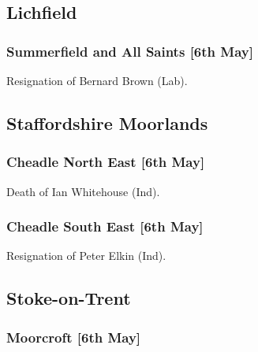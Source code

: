 \documentclass[a4paper,openany]{book}
\begin{document}
\begin{resultsiii}
\subsection*{Lichfield}

\subsubsection*{Summerfield and All Saints \hspace*{\fill}\nolinebreak[1]%
	\enspace\hspace*{\fill}
	[6th May]}


Resignation of Bernard Brown (Lab).

\subsection*{Staffordshire Moorlands}

\subsubsection*{Cheadle North East \hspace*{\fill}\nolinebreak[1]%
	\enspace\hspace*{\fill}
	[6th May]}


Death of Ian Whitehouse (Ind).

\subsubsection*{Cheadle South East \hspace*{\fill}\nolinebreak[1]%
	\enspace\hspace*{\fill}
	[6th May]}


Resignation of Peter Elkin (Ind).

\subsection*{Stoke-on-Trent}

\subsubsection*{Moorcroft \hspace*{\fill}\nolinebreak[1]%
	\enspace\hspace*{\fill}
	[6th May]}


\end{resultsiii}
\end{document}
